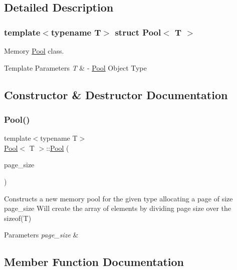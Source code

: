 \subsection{Detailed Description}
\subsubsection*{template$<$typename T$>$\newline
struct Pool$<$ T $>$}

Memory \hyperlink{structPool}{Pool} class. 


\begin{DoxyTemplParams}{Template Parameters}
{\em T} & -\/ \hyperlink{structPool}{Pool} Object Type \\
\hline
\end{DoxyTemplParams}


\subsection{Constructor \& Destructor Documentation}
\mbox{\label{structPool_ac50d71cb692c4d2af30c19aaea712452}} 
\subsubsection{\texorpdfstring{Pool()}{Pool()}}
{\footnotesize\ttfamily template$<$typename T$>$ \\
\hyperlink{structPool}{Pool}$<$ T $>$\+::\hyperlink{structPool}{Pool} (\begin{DoxyParamCaption}\item[{size\+\_\+t}]{page\+\_\+size }\end{DoxyParamCaption})\hspace{0.3cm}{\ttfamily [inline]}}



Constructs a new memory pool for the given type allocating a page of size page\+\_\+size Will create the array of elements by dividing page size over the sizeof(\+T) 


\begin{DoxyParams}{Parameters}
{\em page\+\_\+size} & \\
\hline
\end{DoxyParams}


\subsection{Member Function Documentation}
\mbox{\label{structPool_acd4376142aedecbecca8e52aa8f77f34}} 
